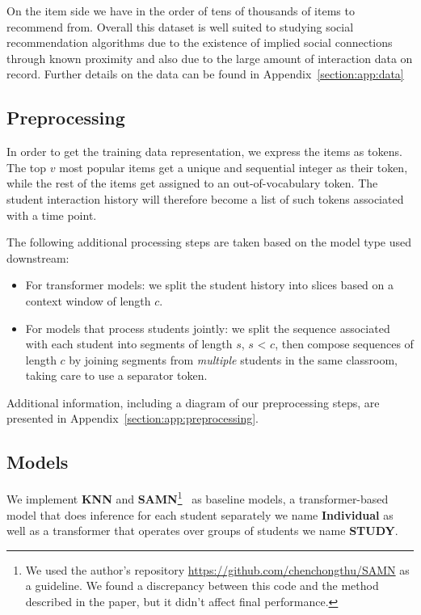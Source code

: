 \documentclass{article}
\begin{document}
On the item side we have in the order of tens of thousands of items to recommend from.
Overall this dataset is well suited to studying social recommendation algorithms due to the existence of implied social connections through known proximity and also due to the large amount of interaction data on record. Further details on the data can be found in Appendix~\ref{section:app:data}




\subsection{Preprocessing}
\label{section:preprocessing}

In order to get the training data representation, we express the items as tokens. The top $v$ most popular items get a unique and sequential integer as their token, while the rest of the items get assigned to an out-of-vocabulary token. The student interaction history will therefore become a list of such tokens associated with a time point.

The following additional processing steps are taken based on the model type used downstream:
\begin{itemize}
    \item For transformer models: we split the student history into slices based on a context window of length $c$.
    \item For models that process students jointly: we split the sequence associated with each student into segments of length $s$, $s$ < $c$, then compose sequences of length $c$ by joining segments from \textit{multiple} students in the same classroom, taking care to use a separator token.
\end{itemize}

Additional information, including a diagram of our preprocessing steps, are presented in Appendix~\ref{section:app:preprocessing}.

\subsection{Models}
We implement \textbf{KNN} and \textbf{SAMN}\footnote{We used the author's repository \url{https://github.com/chenchongthu/SAMN} as a guideline. We found a discrepancy between this code and the method described in the paper, but it didn't affect final performance.}~\cite{chen2019behavior} as baseline models, a transformer-based model that does inference for each student separately we name \textbf{Individual} as well as a transformer that operates over groups of students we name \textbf{STUDY}. 
\end{document}
